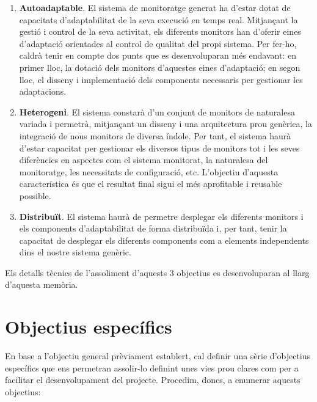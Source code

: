 \begin{enumerate}
\item \textbf{Autoadaptable}. El sistema de monitoratge generat ha d'estar dotat de capacitats d'adaptabilitat de la seva execució en temps real. Mitjançant la gestió i control de la seva activitat, els diferents monitors han d'oferir eines d'adaptació orientades al control de qualitat del propi sistema. Per fer-ho, caldrà tenir en compte dos punts que es desenvoluparan més endavant: en primer lloc, la dotació dels monitors d'aquestes eines d'adaptació; en segon lloc, el disseny i implementació dels components necessaris per gestionar les adaptacions.
\item \textbf{Heterogeni}. El sistema constarà d’un conjunt de monitors de naturalesa variada i permetrà, mitjançant un disseny i una arquitectura prou genèrica, la integració de nous monitors de diversa índole. Per tant, el sistema haurà d’estar capacitat per gestionar els diversos tipus de monitors tot i les seves diferències en aspectes com el sistema monitorat, la naturalesa del monitoratge, les necessitats de configuració, etc. L'objectiu d'aquesta característica és que el resultat final sigui el més aprofitable i reusable possible.
\item \textbf{Distribuït}. El sistema haurà de permetre desplegar els diferents monitors i els components d'adaptabilitat de forma distribuïda i, per tant, tenir la capacitat de desplegar els diferents components com a elements independents dins el nostre sistema genèric.
\end{enumerate}

Els detalls tècnics de l'assoliment d'aquests 3 objectius es desenvoluparan al llarg d'aquesta memòria. 

\section{Objectius específics}

En base a l’objectiu general prèviament establert, cal definir una sèrie d’objectius específics que ens permetran assolir-lo definint unes vies prou clares com per a facilitar el desenvolupament del projecte. Procedim, doncs, a enumerar aquests objectius:


